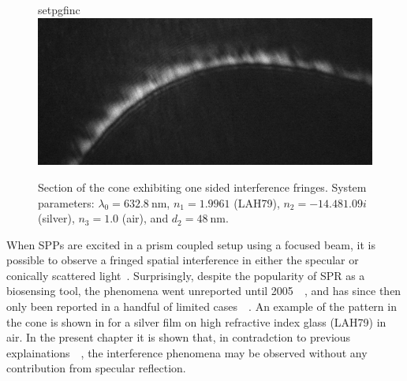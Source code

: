 \begin{figure}[ht]
 \centering
 {setpgfinc}
 \includegraphics[keepaspectratio,width=15.5cm]{interference/figures/coneintro.png}
 \caption{Section of the cone exhibiting one sided interference fringes.
 System parameters: $\lambda_0 = \SI{632.8}{\nano\meter}$,
 $n_1=1.9961$ (LAH79), $n_2 = \num{-14.48+1.09i}$ (silver), $n_3=1.0$
 (air), and $d_2=\SI{48}{\nano\meter}$.}
\label{fig:coneintrofig} 
\end{figure}
When SPPs are excited in a prism coupled setup using a focused beam, it is
possible to observe a fringed spatial interference in either the
specular or conically scattered light~\cite{webster2013interference}.
Surprisingly, despite the popularity of SPR as a biosensing tool, the
phenomena went unreported until
2005~\cite{schumann2008near}~\cite{andaloro2005optical}, and has since then
only been reported in a handful of limited
cases~\cite{shan2009measuring}~\cite{simon2007observation}.  An example of the
pattern in the cone is shown in  for a silver film on
high refractive index glass (LAH79) in air.  In the present chapter it is
shown that, in contradction to previous
explainations~\cite{schumann2008near}~\cite{andaloro2005optical}, the
interference phenomena may be observed without any contribution from specular
reflection.  

